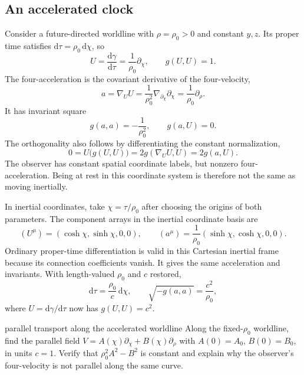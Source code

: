 \documentclass[11pt,a4paper]{article}
\numberwithin{equation}{section}
\newcommand{\dd}{\mathrm d}
\begin{document}
\subsection{An accelerated clock}

Consider a future-directed worldline with \(\rho=\rho_0>0\) and constant
\(y,z\). Its proper time satisfies \(\dd\tau=\rho_0\,\dd\chi\), so
\[
 U=\frac{\dd\gamma}{\dd\tau}=\frac1{\rho_0}\partial_\chi,
 \qquad g(U,U)=1.
\]
The four-acceleration is the covariant derivative of the four-velocity,
\[
 a=\nabla_UU
   =\frac1{\rho_0^2}\nabla_{\partial_\chi}\partial_\chi
   =\frac1{\rho_0}\partial_\rho.
\]
It has invariant square
\[
 g(a,a)=-\frac1{\rho_0^2},\qquad g(a,U)=0.
\]
The orthogonality also follows by differentiating the constant
normalization,
\[
 0=U\bigl(g(U,U)\bigr)=2g(\nabla_UU,U)=2g(a,U).
\]
The observer has constant spatial coordinate labels, but nonzero
four-acceleration. Being at rest in this coordinate system is therefore
not the same as moving inertially.

In inertial coordinates, take \(\chi=\tau/\rho_0\) after choosing the
origins of both parameters. The component arrays in the inertial
coordinate basis are
\[
 (U^\mu)=(\cosh\chi,\sinh\chi,0,0),\qquad
 (a^\mu)=\frac1{\rho_0}(\sinh\chi,\cosh\chi,0,0).
\]
Ordinary proper-time differentiation is valid in this Cartesian inertial
frame because its connection coefficients vanish. It gives the same
acceleration and invariants. With length-valued \(\rho_0\) and \(c\) restored,
\[
 \dd\tau=\frac{\rho_0}{c}\,\dd\chi,\qquad
 \sqrt{-g(a,a)}=\frac{c^2}{\rho_0},
\]
where \(U=\dd\gamma/\dd\tau\) now has \(g(U,U)=c^2\).

\begin{studentwork}[4.3cm]{parallel transport along the accelerated worldline}
Along the fixed-\(\rho_0\) worldline, find the parallel field
\(V=A(\chi)\partial_\chi+B(\chi)\partial_\rho\) with
\(A(0)=A_0\), \(B(0)=B_0\), in units \(c=1\). Verify that
\(\rho_0^2A^2-B^2\) is constant and explain why the observer's
four-velocity is not parallel along the same curve.
\end{studentwork}
\end{document}

